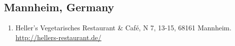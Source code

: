 \subsection{Mannheim, Germany}
\begin{enumerate}
 \item Heller's Vegetarisches Restaurant \& Café, N 7, 13-15, 68161 Mannheim. \href{http://hellers-restaurant.de/}{http://hellers-restaurant.de/}
\end{enumerate}